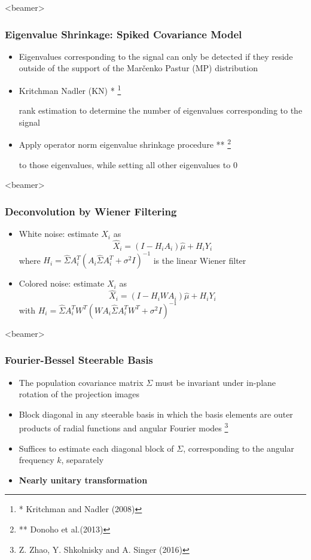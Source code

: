 \documentclass{beamer}
\newcommand\blfootnote[1]{%
  \begingroup
  \renewcommand\thefootnote{}\footnote{#1}%
  \addtocounter{footnote}{-1}%
  \endgroup
}
\begin{document}
\begin{frame}<beamer>
\frametitle{Eigenvalue Shrinkage: Spiked Covariance Model}
\begin{itemize}[]
\item Eigenvalues corresponding to the signal 
can only be detected if they reside outside of the support of the  Mar\v{c}enko Pastur (MP)
distribution
\item Kritchman Nadler (KN) *\blfootnote{{* Kritchman and Nadler
(2008)}} rank estimation to determine the number of eigenvalues 
corresponding to the signal 
\item Apply operator norm eigenvalue 
shrinkage procedure **\blfootnote{** Donoho et al.(2013)} to those eigenvalues, while setting all other eigenvalues to 
$0$ 
\end{itemize}
\end{frame}


\begin{frame}<beamer>
\frametitle{Deconvolution by Wiener Filtering}

\begin{itemize}
\item White noise: estimate $X_i$ as
\begin{equation}
\hat X_i = (I-H_iA_{i})\hat\mu + H_iY_i 
\end{equation}
where $H_i = \hat \Sigma A_{i}^T ( A_{i} \hat \Sigma A_{i}^T + \sigma^2 
I)^{-1} $ is the linear Wiener filter  
\item Colored noise: estimate $X_i$ as
\begin{equation}
\hat X_i = (I-H_iWA_{i})\hat\mu + H_iY_i 
\end{equation}
with $H_i = \hat \Sigma A_{i}^T W^T (W A_{i} \hat \Sigma A_{i}^T W^T 
+ \sigma^2 I)^{-1}$
\end{itemize}
\end{frame}


\begin{frame}<beamer>
\frametitle{Fourier-Bessel Steerable Basis }
\begin{itemize}[]
\item The population covariance matrix $\Sigma$ must be invariant under in-plane 
rotation of the projection images
\item Block diagonal in any steerable basis in which the 
basis elements are outer products of radial functions and angular Fourier modes\blfootnote{Z. Zhao, Y. Shkolnisky and A. Singer (2016)}
\item Suffices to 
estimate each diagonal block of $\Sigma$, corresponding to the angular frequency $k$, separately
\item \textbf{Nearly unitary transformation}
\end{itemize}
\end{frame}
\end{document}
